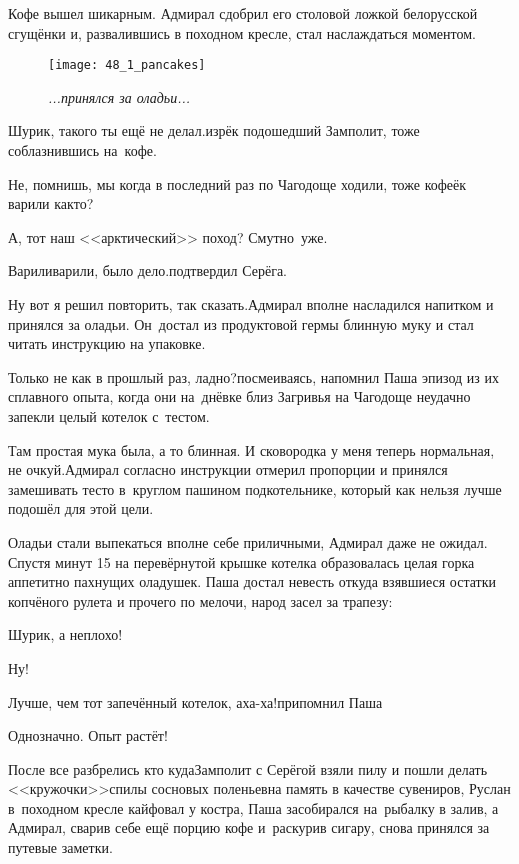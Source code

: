 Кофе вышел шикарным. Адмирал сдобрил его столовой ложкой белорусской сгущёнки и, развалившись в походном кресле, стал наслаждаться моментом.

\newpage

\begin{wrapfigure}[20]{r}{0.58\textwidth}
	\centering
	\texttt{[image: 48\_1\_pancakes]}
	\caption{\small\textit{...принялся за оладьи...}}
\end{wrapfigure}
\diagdash Шурик, такого ты ещё не делал.\mdash изрёк подошедший Замполит, тоже соблазнившись на~кофе.

\diagdash Не, помнишь, мы когда в последний раз по Чагодоще ходили, тоже кофеёк варили как\sdash то?

\diagdash А, тот наш <<арктический>> поход? Смутно~уже.

\diagdash Варили\sdash варили, было дело.\mdash подтвердил Серёга.

\diagdash Ну вот я решил повторить, так сказать.\mdash Адмирал вполне насладился напитком и принялся за оладьи. Он~достал из продуктовой гермы блинную муку и стал читать инструкцию на упаковке.

\diagdash Только не как в прошлый раз, ладно?\mdash посмеиваясь, напомнил Паша эпизод из их сплавного опыта, когда они на~днёвке близ Загривья на Чагодоще неудачно запекли целый котелок с~тестом.

\diagdash Там простая мука была, а то блинная. И сковородка у меня теперь нормальная, не очкуй.\mdash Адмирал согласно инструкции отмерил пропорции и принялся замешивать тесто в~круглом пашином подкотельнике, который как нельзя лучше подошёл для этой цели.

Оладьи стали выпекаться вполне себе приличными, Адмирал даже не ожидал. Спустя минут 15 на перевёрнутой крышке котелка образовалась целая горка аппетитно пахнущих оладушек. Паша достал невесть откуда взявшиеся остатки копчёного рулета и прочего по мелочи, народ засел за трапезу:

\diagdash Шурик, а неплохо!

\diagdash Ну!

\diagdash Лучше, чем тот запечённый котелок, аха-ха!\mdash припомнил Паша

\diagdash Однозначно. Опыт растёт!

После все разбрелись кто куда\mdash Замполит с Серёгой взяли пилу и пошли делать <<кружочки>>\mdash спилы сосновых поленьев\mdash на память в качестве сувениров, Руслан в~походном кресле кайфовал у костра, Паша засобирался на~рыбалку в залив, а Адмирал, сварив себе ещё порцию кофе и~раскурив сигару, снова принялся за путевые заметки.

